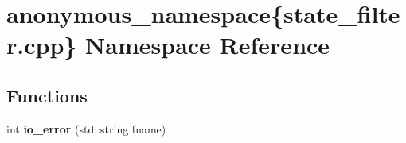 \hypertarget{namespaceanonymous__namespace_02state__filter_8cpp_03}{\section{anonymous\-\_\-namespace\{state\-\_\-filter.\-cpp\} Namespace Reference}
\label{namespaceanonymous__namespace_02state__filter_8cpp_03}
}
\subsection*{Functions}
\begin{DoxyCompactItemize}
\item 
\hypertarget{namespaceanonymous__namespace_02state__filter_8cpp_03_a72fcedcf4a5d4483a7fcdc4fd3ebb1ab}{int {\bfseries io\-\_\-error} (std\-::string fname)}\label{namespaceanonymous__namespace_02state__filter_8cpp_03_a72fcedcf4a5d4483a7fcdc4fd3ebb1ab}

\end{DoxyCompactItemize}
